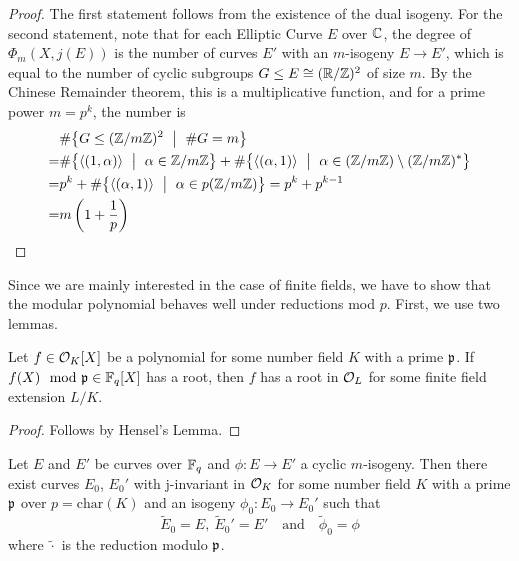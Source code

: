 \begin{proof}
    The first statement follows from the existence of the dual isogeny.
    For the second statement, note that for each Elliptic Curve $E$ over $\mathbb{C}$, the degree of $\Phi_m(X, j(E))$ is the number of curves $E'$ with an $m$-isogeny $E \to E'$, which is equal to the number of cyclic subgroups $G \leq E \cong (\mathbb{R}/\mathbb{Z})^2$ of size $m$.
    By the Chinese Remainder theorem, this is a multiplicative function, and for a prime power $m = p^k$, the number is
    \begin{align*}
       &\#\bigl\{ G \leq (\Z/m\Z)^2 \ \bigm| \ \#G = m \bigr\} \\
       =& \#\bigl\{ \langle (1, \alpha) \rangle \ \bigm| \ \alpha \in \Z/m\Z \bigr\} + \#\bigl\{ \langle (\alpha, 1) \rangle \ \bigm| \ \alpha \in (\Z/m\Z) \setminus (\Z/m\Z)^* \bigr\} \\
       =& p^k + \#\bigl\{ \langle (\alpha, 1) \rangle \ \bigm| \ \alpha \in p(\Z/m\Z) \bigr\} = p^k + p^{k - 1} \\
       =& m \left( 1 + \frac 1 p \right) \qedhere
    \end{align*}
\end{proof}
Since we are mainly interested in the case of finite fields, we have to show that the modular polynomial behaves well under reductions mod $p$.
First, we use two lemmas.
\begin{lemma}
    \label{prop:modified_hensel_lifting}
    Let $f \in \mathcal{O}_K[X]$ be a polynomial for some number field $K$ with a prime $\mathfrak{p}$.
    If $f(X) \mod {\mathfrak{p}} \in \mathbb{F}_q[X]$ has a root, then $f$ has a root in $\mathcal{O}_L$ for some finite field extension $L/K$.
\end{lemma}
\begin{proof}
    Follows by Hensel's Lemma.
\end{proof}
\begin{lemma}
    Let $E$ and $E'$ be curves over $\mathbb{F}_q$ and $\phi: E \to E'$ a cyclic $m$-isogeny.
    Then there exist curves $E_0$, $E_0'$ with j-invariant in $\mathcal{O}_K$ for some number field $K$ with a prime $\mathfrak{p}$ over $p = \mathrm{char}(K)$ and an isogeny $\phi_0: E_0 \to E_0'$ such that
    \begin{equation*}
        \tilde{E}_0 = E, \ \tilde{E}_0' = E' \quad \text{and} \quad \tilde{\phi}_0 = \phi
    \end{equation*}
    where $\tilde{\cdot}$ is the reduction modulo $\mathfrak{p}$.
\end{lemma}
